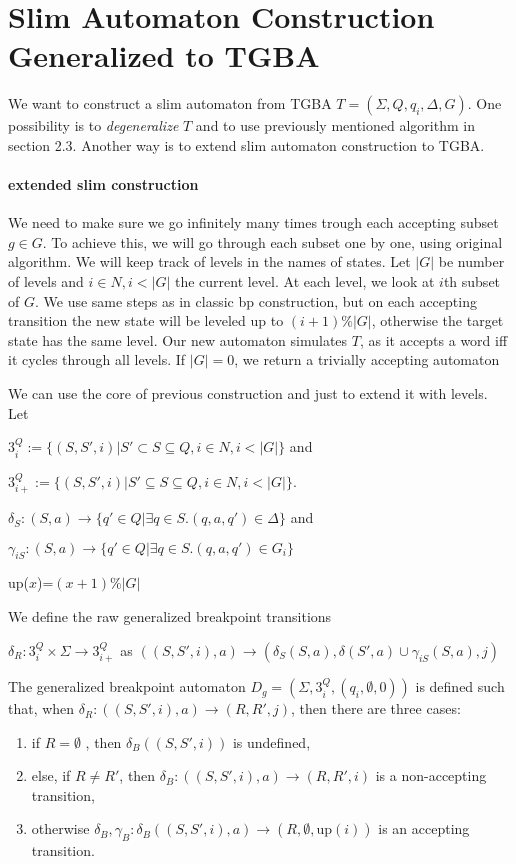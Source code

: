 \documentclass[
	digital
nolof, nolot
]{fithesis3}
\begin{document}
			\section{Slim Automaton Construction Generalized to TGBA}
			We want to construct a slim automaton from TGBA $T=(\Sigma, Q, q_i, \Delta, G)$. One possibility is to \emph{degeneralize} $T$ and to use previously mentioned algorithm in section 2.3. Another way is to extend slim automaton construction to TGBA.
			\paragraph{extended slim construction}
			We need to make sure we go infinitely many times trough each accepting subset $g \in G$. To achieve this, we will go through each subset one by one, using original algorithm. We will keep track of levels in the names of states. Let $|G|$ be number of levels and $i \in N, i<|G|$ the current level. At each level, we look at $i$th subset of $G$. We use same steps as in classic bp construction, but on each accepting transition the new state will be leveled up to $(i+1)\%|G|$, otherwise the target state has the same level. Our new automaton simulates $T$, as it accepts a word iff it cycles through all levels. If $|G|=0$, we return a trivially accepting automaton
			
			We can use the core of previous construction and just to extend it with levels. Let
			
			$3^Q_i :=\{(S,S',i)|S'\subset S \subseteq Q, i \in N, i<|G|\}$ and
			
			$3^Q_{i+}:=\{(S,S',i)|S'\subseteq S \subseteq Q, i \in N, i<|G|\}$.
			
			$\delta_S: (S,a)\rightarrow\{q'\in Q | \exists q \in S.(q,a,q') \in \Delta\}$ and
			
			$\gamma_{iS}: (S,a)\rightarrow\{q'\in Q | \exists q \in S.(q,a,q') \in G_i\}$
			
			up($x$)=$(x+1)\%|G|$
			
			We define the raw generalized breakpoint transitions 
			
			$\delta_R:3^Q_i \times \Sigma \rightarrow 3^Q_{i+}$ as
			$((S, S', i), a) \rightarrow(\delta_S(S, a), \delta(S',a)\cup \gamma_{iS}(S, a), j)$
			
			The generalized breakpoint automaton $D_g=(\Sigma, 3^Q_i, ({q_i},\emptyset, 0))$ is defined such that, when $\delta_R:((S, S', i), a) \rightarrow (R, R', j)$, then there are three cases:
			\begin{enumerate}
				\item if $R=\emptyset$ , then $\delta_B((S,S',i))$ is undefined,
				\item else, if $R \neq R'$, then $\delta_B:((S,S',i),a) \rightarrow (R,R',i)$ is a non-accepting transition,
				\item otherwise $\delta_B, \gamma_B: \delta_B((S,S',i),a)\rightarrow(R, \emptyset, \text{up}(i))$ is an accepting transition. 
			\end{enumerate}
		
\end{document}
